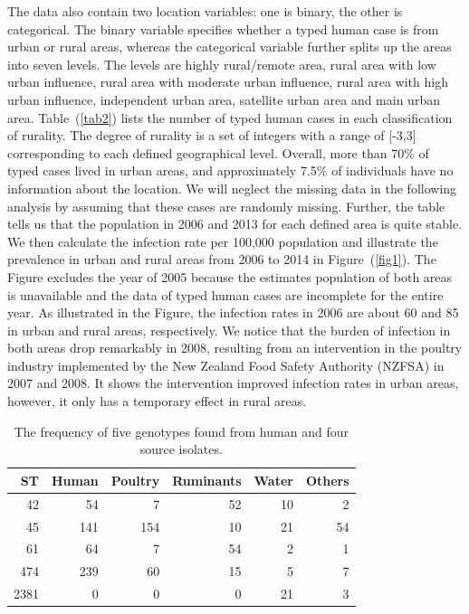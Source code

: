 \documentclass[times, doublespace]{simauth}%
\begin{document}
The data also contain two location variables: one is binary, the other is categorical. The binary variable specifies whether a typed human case is from urban or rural areas, whereas the categorical variable further splits up the areas into seven levels. The levels are highly rural/remote area, rural area with low urban influence, rural area with moderate urban influence, rural area with high urban influence, independent urban area, satellite urban area and main urban area. Table~(\ref{tab2}) lists the number of typed human cases in each classification of rurality. The degree of rurality is a set of integers with a range of [-3,3] corresponding to each defined geographical level. Overall, more than 70\% of typed cases lived in urban areas, and approximately 7.5\% of individuals have no information about the location. We will neglect the missing data in the following analysis by assuming that these cases are randomly missing. Further, the table tells us that the population in 2006 and 2013 for each defined area \cite{Stat1, Stat2} is quite stable. We then calculate the infection rate per 100,000 population and illustrate the prevalence in urban and rural areas from 2006 to 2014 in Figure~(\ref{fig1}). The Figure excludes the year of 2005 because the estimates population of both areas is unavailable and the data of typed human cases are incomplete for the entire year. As illustrated in the Figure, the infection rates in 2006 are about 60 and 85 in urban and rural areas, respectively. We notice that the burden of infection in both areas drop remarkably in 2008, resulting from an intervention in the poultry industry implemented by the New Zealand Food Safety Authority (NZFSA) in 2007 and 2008. It shows the intervention improved infection rates in urban areas, however, it only has a temporary effect in rural areas.

\begin{table}
  \begin{center}
    \begin{tabular}{rrrrrr}
      \toprule
      ST & Human & Poultry & Ruminants & Water & Others\\ \midrule
      42 & 54 & 7 & 52 & 10 & 2\\
      45  & 141 & 154 & 10 & 21 & 54\\
      61 & 64 & 7 & 54 & 2 & 1\\
      474 & 239 & 60 & 15 & 5 & 7\\
      2381 & 0 & 0 & 0 & 21 & 3\\
      \bottomrule
    \end{tabular}
  \end{center}
  \caption{The frequency of five genotypes found from human and four source isolates.}
  \label{tab1}
\end{table}
\end{document}
